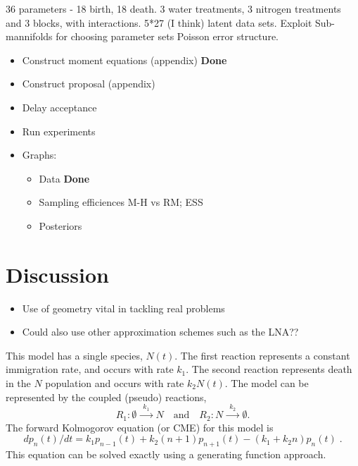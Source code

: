 \documentclass{pnastwo}
\begin{document}
\begin{article}
36 parameters - 18 birth, 18 death. 3 water treatments, 3 nitrogen treatments
and 3 blocks, with interactions. 5*27 (I think) latent data sets. Exploit Sub-mannifolds for choosing parameter sets
Poisson error structure. 


    \begin{itemize}
    \item Construct moment equations (appendix) \textbf{Done}
    \item Construct proposal (appendix)
    \item Delay acceptance
    \item Run experiments
    \item Graphs:
      \begin{itemize}
      \item Data \textbf{Done}
      \item Sampling efficiences M-H vs RM; ESS
      \item Posteriors
      \end{itemize}
    \end{itemize}
    
\section{Discussion}

\begin{itemize}
\item Use of geometry vital in tackling real problems
\item Could also use other approximation schemes such as the LNA??
\end{itemize}








This model has a single species, $N(t)$. The first reaction represents a constant immigration rate, and occurs with rate $k_1$. The second reaction represents death in the $N$ population and occurs with rate $k_2 N(t)$. The model can be represented by the coupled (pseudo) reactions, 
\begin{equation}\label{1}
R_1: \emptyset  \xrightarrow{\phantom{a}k_1\phantom{a}} N 
\quad \text{and} \quad
R_2: N  \xrightarrow{\phantom{a}k_2\phantom{a}} \emptyset.
\end{equation}
The forward Kolmogorov equation (or CME) for this model is
\[
dp_{n}(t)/dt = k_1 p_{n-1}(t) +  k_2 (n+1) p_{n+1}(t) 
- (k_1 + k_2 n) p_{n}(t) \;.
\]
This equation can be solved exactly using a generating function approach.


\end{article}
\end{document}
